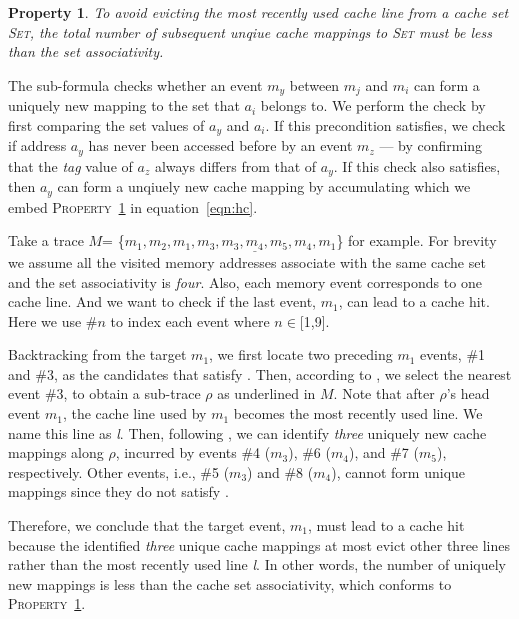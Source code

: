 \documentclass[sigconf, review]{acmart}
\newcommand*\circled[1]{\tikz[baseline=(char.base)]{
				\node[shape=circle,draw,inner sep=.4pt] (char) {\scriptsize{#1}};}}
\newtheorem{pro}{Property}
\begin{document}
\begin{pro}
  \label{pro:p1}
  To avoid evicting the most recently used cache line from a cache set 
  \textsc{Set}, the total number of subsequent unqiue cache mappings to 
  \textsc{Set} must be less than the set associativity.
\end{pro}


The sub-formula \circled{3} checks whether an event $\mathit{m_y}$ between 
$\mathit{m_j}$ and $\mathit{m_i}$ can form a uniquely new mapping to the set 
that $\mathit{a_i}$ belongs to. We perform the check by first comparing the 
set values of $\mathit{a_y}$ and $\mathit{a_i}$. If this precondition satisfies, 
we check if address $\mathit{a_y}$ has never been accessed before by an event
$\mathit{m_z}$ --- by confirming that the \emph{tag} value of $\mathit{a_z}$ 
always differs from that of $\mathit{a_y}$. If this check also satisfies, then 
$\mathit{a_y}$ can form a unqiuely new cache mapping by accumulating which
we embed \textsc{Property}~\ref{pro:p1} in equation~\ref{eqn:hc}.


Take a trace $\mathit{M}$=
\{$\mathit{m_1,m_2,\underline{m_1,m_3,m_3,m_4,m_5,m_4,m_1}}$\} for example. For 
brevity we assume all the visited memory addresses associate with the same cache 
set and the set associativity is \textit{four}. Also, each memory event corresponds 
to one cache line. And we want to check if the last event, $\mathit{m_1}$, can 
lead to a cache hit. Here we use \#$n$ to index each event where $n\in$[1,9].


Backtracking from the target $\mathit{m_1}$, we first locate two preceding
$\mathit{m_1}$ events, \#1 and \#3, as the candidates that satisfy \circled{1}. 
Then, according to \circled{2}, we select the nearest event \#3, to obtain a 
sub-trace $\rho$ as underlined in $\mathit{M}$. Note that after $\rho$'s 
head event $\mathit{m_1}$, the cache line used by $\mathit{m_1}$ becomes 
the most recently used line. We name this line as \emph{l}. Then, following 
\circled{3}, we can identify \emph{three} uniquely new cache mappings along 
$\rho$, incurred by events \#4 ($\mathit{m_3}$), \#6 ($\mathit{m_4}$), and 
\#7 ($\mathit{m_5}$), respectively. Other events, i.e., \#5 ($\mathit{m_3}$) 
and \#8 ($\mathit{m_4}$), cannot form unique mappings since they do not satisfy 
\circled{3}.


Therefore, we conclude that the target event, $\mathit{m_1}$, must lead to a 
cache hit because the identified \emph{three} unique cache mappings at most 
evict other three lines rather than the most recently used line \emph{l}. In 
other words, the number of uniquely new mappings is less than the cache set 
associativity, which conforms to \textsc{Property}~\ref{pro:p1}.
\end{document}
